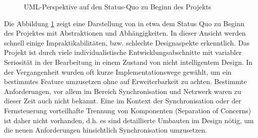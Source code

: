 \begin{figure}

\centering
{}
\caption{UML-Perspektive auf den Status-Quo zu Beginn des Projekts}
\label{fig:status_quo}
\end{figure}

Die Abbildung \ref{fig:status_quo} zeigt eine Darstellung von in etwa dem Status Quo zu Beginn des Projektes mit Abstraktionen und Abhängigkeiten.
In dieser Ansicht werden schnell einige Impraktikabilitäten, bzw. schlechte Designaspekte erkenntlich.
Das Projekt ist durch viele individualistische Entwicklungsabschnitte mit variabler Seriosität in der Bearbeitung in einem Zustand von nicht intelligentem Design. 
In der Vergangenheit wurden oft kurze Implementationswege gewählt, um ein bestimmtes Feature umzusetzen ohne auf Erweiterbarkeit zu achten. Bestimmte Anforderungen, vor allem im Bereich Synchronisation und Netzwerk waren zu dieser Zeit auch nicht bekannt.
Eine im Kontext der Synchronisation oder der Fernsteuerung vorteilhafte Trennung von Komponenten (Separation of Concerns) ist daher nicht vorhanden, d.h. es sind detaillierte Umbauten im Design nötig, um die neuen Anforderungen hinsichtlich Synchronisation umzusetzen.

